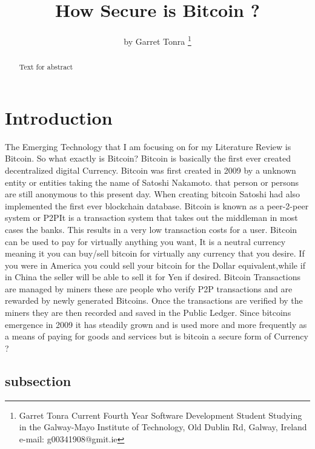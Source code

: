 \documentclass[report]{IEEEtran}
\begin{document}
\title{How Secure is Bitcoin ? }
\author{by Garret Tonra %
\thanks{Garret Tonra Current Fourth Year
Software Development Student Studying in the Galway-Mayo Institute of Technology, Old Dublin Rd, Galway, Ireland 
e-mail: g00341908@gmit.ie}%
}

\maketitle

\begin{abstract}
Text for abstract
\end{abstract}


\section{Introduction}The Emerging Technology that I am focusing on for my Literature Review is Bitcoin. So what exactly is Bitcoin?\newline
Bitcoin is basically the first ever created decentralized digital Currency. Bitcoin was first created in 2009 by a unknown entity or entities taking the name of Satoshi Nakamoto. that person or persons are still anonymous to this present day. When creating bitcoin Satoshi had also implemented the first ever blockchain database. Bitcoin is known as a peer-2-peer system or P2P\newline It is a transaction system that takes out the middleman in most cases the banks. This results in a very low transaction costs for a user. Bitcoin can be used to pay for virtually anything you want, It is a neutral currency meaning it you can buy/sell bitcoin for virtually any currency that you desire. If you were in America you could sell your bitcoin for the Dollar equivalent,while if in China the seller will be able to sell it for Yen if desired. Bitcoin Transactions are managed by miners these are people who verify P2P transactions and are rewarded by newly generated Bitcoins. Once the transactions are verified by the miners they are then recorded and saved in the Public Ledger. Since bitcoins emergence in 2009 it has steadily grown and is used more and more frequently as a means of paying for goods and services but is bitcoin a secure form of Currency ?

\subsection{subsection}
\end{document}
